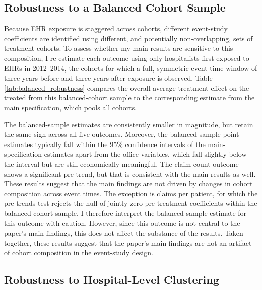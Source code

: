 \documentclass[12pt]{article}
\begin{document}
\subsection{Robustness to a Balanced Cohort Sample}\label{sec:balanced}

Because EHR exposure is staggered across cohorts, different event-study coefficients are identified using different, and potentially non-overlapping, sets of treatment cohorts. To assess whether my main results are sensitive to this composition, I re-estimate each outcome using only hospitalists first exposed to EHRs in 2012--2014, the cohorts for which a full, symmetric event-time window of three years before and three years after exposure is observed. Table \ref{tab:balanced_robustness} compares the overall average treatment effect on the treated from this balanced-cohort sample to the corresponding estimate from the main specification, which pools all cohorts.



The balanced-sample estimates are consistently smaller in magnitude, but retain the same sign across all five outcomes. Moreover, the balanced-sample point estimates typically fall within the 95\% confidence intervals of the main-specification estimates apart from the office variables, which fall slightly below the interval but are still economically meaningful. The claim count outcome shows a significant pre-trend, but that is consistent with the main results as well. These results suggest that the main findings are not driven by changes in cohort composition across event times. The exception is claims per patient, for which the pre-trends test rejects the null of jointly zero pre-treatment coefficients within the balanced-cohort sample. I therefore interpret the balanced-sample estimate for this outcome with caution. However, since this outcome is not central to the paper's main findings, this does not affect the substance of the results. Taken together, these results suggest that the paper's main findings are not an artifact of cohort composition in the event-study design.



\subsection{Robustness to Hospital-Level Clustering}\label{sec:cluster_robustness}
\end{document}
